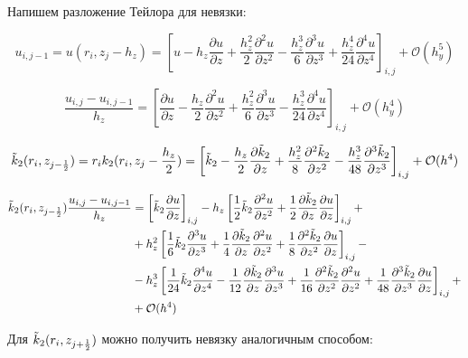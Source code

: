 Напишем разложение Тейлора для невязки:

\[
u_{i, j - 1} = u(r_i, z_j - h_z) = \left[
  u - h_z \frac{\partial u}{\partial z} + \frac{h_z^2}{2}\frac{\partial^2 u}{\partial z^2}
  - \frac{h_z^3}{6}\frac{\partial^3 u}{\partial z^3} + \frac{h_z^4}{24}\frac{\partial^4 u}{\partial z^4}
\right]_{i, j} + \mathcal{O}(h^5_y)
\]

\[
  \frac{u_{i, j} - u_{i, j - 1}}{h_z} = \left[
    \frac{\partial u}{\partial z} - \frac{h_z}{2}\frac{\partial^2 u}{\partial z^2}
    + \frac{h_z^2}{6}\frac{\partial^3 u}{\partial z^3} - \frac{h_z^3}{24}\frac{\partial^4 u}{\partial z^4}
  \right]_{i,j} + \mathcal{O}(h^4_y)
\]

\[
  \Tilde{k}_2(r_i, z_{j-\frac{1}{2}}) = r_i k_2(r_i, z_j - \frac{h_z}{2}) =
  \left[
   \Tilde{k}_2 - \frac{h_z}{2} \frac{\partial \Tilde{k}_2}{\partial z}
   + \frac{h_z^2}{8} \frac{\partial^2 \Tilde{k}_2}{\partial z^2}
   - \frac{h_z^3}{48} \frac{\partial^3 \Tilde{k}_2}{\partial z^3}
  \right]_{i, j} + \mathcal{O}(h^4)
\]

\begin{align*}
  \Tilde{k}_2(r_i, z_{j-\frac{1}{2}}) \frac{u_{i, j} - u_{i, j - 1}}{h_z} &= 
  \left[ \Tilde{k}_2 \frac{\partial u}{\partial z} \right]_{i, j}
  - h_z \left[
  \frac{1}{2} \Tilde{k}_2 \frac{\partial^2 u}{\partial z^2}
  + \frac{1}{2} \frac{\partial \Tilde{k}_2}{\partial z} \frac{\partial u}{\partial z}
  \right]_{i, j} +\\
  &+ h^2_z \left[
    \frac{1}{6} \Tilde{k}_2 \frac{\partial^3 u}{\partial z^3}
    + \frac{1}{4} \frac{\partial \Tilde{k}_2}{\partial z} \frac{\partial^2 u}{\partial z^2}
    + \frac{1}{8} \frac{\partial^2 \Tilde{k}_2}{\partial z^2} \frac{\partial u}{\partial z}
  \right]_{i, j} -\\
  &- h^3_z \left[
   \frac{1}{24} \Tilde{k}_2 \frac{\partial^4 u}{\partial z^4} - \frac{1}{12} \frac{\partial \Tilde{k}_2}{\partial z} \frac{\partial^3 u}{\partial z^3}
  + \frac{1}{16} \frac{\partial^2 \Tilde{k}_2}{\partial z^2} \frac{\partial^2 u}{\partial z^2}
  + \frac{1}{48} \frac{\partial^3 \Tilde{k}_2}{\partial z^3} \frac{\partial u}{\partial z}
   \right]_{i, j} +\\
  &+ \mathcal{O}(h^4)
\end{align*}

Для 
$
  \Tilde{k}_2(r_i, z_{j+\frac{1}{2}})
$
можно получить невязку аналогичным способом:

